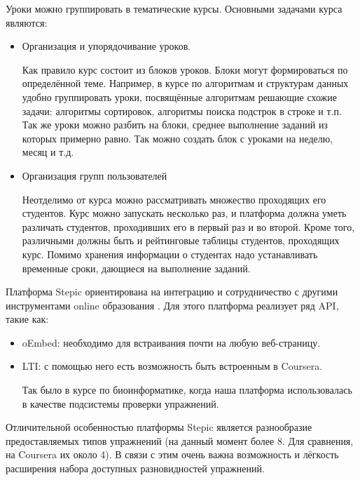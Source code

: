 \documentclass{matmex-diploma-custom}
\begin{document}
Уроки можно группировать в тематические курсы. Основными задачами
курса являются:
\begin{itemize}
\item Организация и упорядочивание уроков.

  Как правило курс состоит из блоков уроков. Блоки могут формироваться
  по определённой теме. Например, в курсе по алгоритмам и структурам
  данных удобно группировать уроки, посвящённые алгоритмам решающие
  схожие задачи: алгоритмы сортировок, алгоритмы поиска подстрок в
  строке и т.п. Так же уроки можно разбить на блоки, среднее
  выполнение заданий из которых примерно равно. Так можно создать блок
  с уроками на неделю, месяц и т.д.
\item Организация групп пользователей

  Неотделимо от курса можно рассматривать множество проходящих его
  студентов. Курс можно запускать несколько раз, и платформа должна уметь
  различать студентов, проходивших его в первый раз и во второй. Кроме
  того, различными должны быть и рейтинговые таблицы студентов,
  проходящих курс. Помимо хранения информации о студентах надо
  устанавливать временные сроки, дающиеся на выполнение заданий.
\end{itemize}

Платформа Stepic ориентирована на интеграцию и сотрудничество с
другими инструментами online образования \cite{dagger2007service}. Для
этого платформа реализует ряд API, такие как:
\begin{itemize}
\item oEmbed: необходимо для встраивания почти на любую веб-страницу.
\item LTI: с помощью него есть возможность быть встроенным в Coursera.

  Так было в курсе по биоинформатике, когда наша платформа
  использовалась в качестве подсистемы проверки упражнений.
\end{itemize}

Отличительной особенностью платформы Stepic является разнообразие
предоставляемых типов упражнений (на данный момент более 8. Для
сравнения, на Coursera их около 4).  В связи с этим очень важна
возможность и лёгкость расширения набора доступных разновидностей
упражнений.
\end{document}
